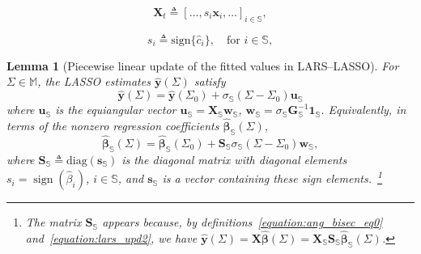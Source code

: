 \documentclass[10pt,a4paper]{amsart}
\newtheorem{lemma}{Lemma}
\newcommand{\bG}{{\bm{G}}}
\newcommand{\bS}{{\bm{S}}}
\newcommand{\bX}{{\bm{X}}}
\newcommand{\bbeta}{{\boldsymbol\beta}}
\newcommand{\bone}{{\bm{1}}}
\newcommand{\bs}{{\bm{s}}}
\newcommand{\bu}{{\bm{u}}}
\newcommand{\bw}{{\bm{w}}}
\newcommand{\bx}{{\bm{x}}}
\newcommand{\diag}{\mathrm{diag}}
\def\sM{{\mathbb{M}}}
\def\sS{{\mathbb{S}}}
\newcommand{\sgn}{\mathrm{sign}}
\DeclareMathOperator{\sign}{sign}
\newcommand{\widehatbbeta}{{\widehat\bbeta}}
\newcommand{\widehatbeta}{{\widehat\beta}}
\newcommand{\widehatby}{\widehat{\bm{y}}}
\newcommand{\widehatc}{\widehat{c}}
\begin{document}
\begin{equation}\label{equation:ang_bisec_eq0}
\bX_t \triangleq  [\ldots, s_i \bx_i, \ldots]_{i \in \sS},
\end{equation}

\begin{equation}\label{equation:lars_upd2}
s_i \triangleq \sgn\{\widehatc_i\}, \quad \text{for } i \in \sS,
\end{equation}

\begin{lemma}[Piecewise linear update of the fitted values in LARS--LASSO]\label{lemma:larslasso_ud_est}
For $\Sigma \in \sM$, the LASSO estimates $\widehatby(\Sigma)$ satisfy
\begin{equation}\label{equation:haty_sigma_linear}
\widehatby(\Sigma) = \widehatby(\Sigma_0) + \sigma_\sS (\Sigma - \Sigma_0) \bu_\sS
\end{equation}
where $\bu_\sS$ is the equiangular vector $\bu_{\sS}=\bX_\sS \bw_\sS$, $\bw_\sS = \sigma_\sS \bG_\sS^{-1} \bone_\sS$.
Equivalently, in terms of the nonzero regression coefficients $\widehatbbeta_\sS(\Sigma)$,
\begin{equation}\label{equation:beta_sigma_linear}
\widehatbbeta_\sS(\Sigma) = \widehatbbeta_\sS(\Sigma_0) + \bS_\sS \sigma_\sS (\Sigma - \Sigma_0) \bw_\sS,
\end{equation}
where $\bS_\sS \triangleq  \diag(\bs_\sS)$ is the diagonal matrix with diagonal elements $s_i = \sign(\widehatbeta_i)$, $i \in \sS$, and $\bs_\sS$ is a vector containing these sign elements.~\footnote{
The matrix $\bS_\sS$ appears because, by definitions~\eqref{equation:ang_bisec_eq0} and~\eqref{equation:lars_upd2}, we have  $\widehatby(\Sigma) = \bX \widehatbbeta(\Sigma) = \bX_\sS \bS_\sS \widehatbbeta_\sS(\Sigma)$.
}
\end{lemma}
\end{document}
